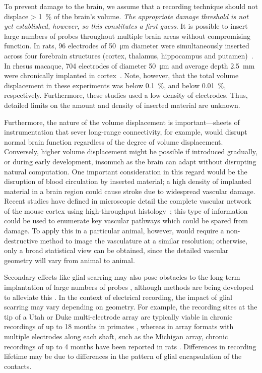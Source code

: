 To prevent damage to the brain, we assume that a recording technique should not displace \SI{> 1}{\percent} of the brain's volume. \emph{The appropriate damage threshold is not yet established, however, so this constitutes a first guess}. It is possible to insert large numbers of probes throughout multiple brain areas without compromising function. In rats, 96 electrodes of \SI{50}{\micro\meter} diameter were simultaneously inserted across four forebrain structures (cortex, thalamus, hippocampus and putamen)~\cite{Ribeiro2004}. In rhesus macaque, 704 electrodes of diameter \SI{50}{\micro\meter} and average depth \SI{2.5}{\milli\meter} were chronically implanted in cortex~\cite{Nicolelis2003}. Note, however, that the total volume displacement in these experiments was below \SI{0.1}{\percent}, and below \SI{0.01}{\percent}, respectively.  Furthermore, these studies used a low density of electrodes. Thus, detailed limits on the amount and density of inserted material are unknown.

Furthermore, the nature of the volume displacement is important---sheets of instrumentation that sever long-range connectivity, for example, would disrupt normal brain function regardless of the degree of volume displacement.
Conversely, higher volume displacement might be possible if introduced gradually, or during early development, insomuch as the brain can adapt without disrupting natural computation. One important consideration in this regard would be the disruption of blood circulation by inserted material; a high density of implanted material in a brain region could cause stroke due to widespread vascular damage. Recent studies have defined in microscopic detail the complete vascular network of the mouse cortex using high-throughput histology~\cite{Kleinfeld2013}; this type of information could be used to enumerate key vascular pathways which could be spared from damage. To apply this in a particular animal, however, would require a non-destructive method to image the vasculature at a similar resolution; otherwise, only a broad statistical view can be obtained, since the detailed vascular geometry will vary from animal to animal. 

Secondary effects like glial scarring may also pose obstacles to the long-term implantation of large numbers of probes \cite{polikov2005response, ward2009toward}, although methods are being developed to alleviate this \cite{taub2012bioactive, reichert2008molecular, reichert2010indwelling}. In the context of electrical recording, the impact of glial scarring may vary depending on geometry. For example, the recording sites at the tip of a Utah or Duke multi-electrode array are typically viable in chronic recordings of up to 18 months in primates \cite{Nicolelis2003, suner2005reliability}, whereas in array formats with multiple electrodes along each shaft, such as the Michigan array, chronic recordings of up to 4 months have been reported in rats \cite{vetter2004chronic}. Differences in recording lifetime may be due to differences in the pattern of glial encapsulation of the contacts.


